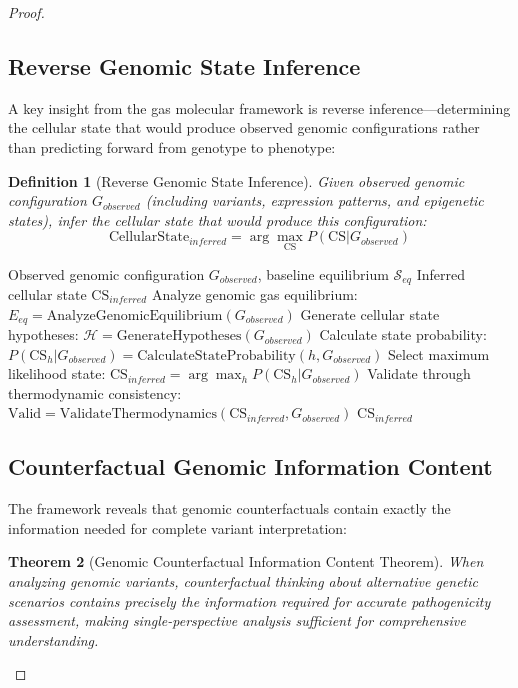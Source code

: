 \documentclass[12pt,a4paper]{article}
\newtheorem{theorem}{Theorem}[section]
\newtheorem{definition}[theorem]{Definition}
\begin{document}
\begin{proof}
\subsection{Reverse Genomic State Inference}

A key insight from the gas molecular framework is reverse inference—determining the cellular state that would produce observed genomic configurations rather than predicting forward from genotype to phenotype:

\begin{definition}[Reverse Genomic State Inference]
Given observed genomic configuration $G_{observed}$ (including variants, expression patterns, and epigenetic states), infer the cellular state that would produce this configuration:
$$\text{CellularState}_{inferred} = \arg\max_{\text{CS}} P(\text{CS} | G_{observed})$$
\end{definition}

\begin{algorithm}
\caption{Reverse Genomic State Inference Algorithm}
\begin{algorithmic}[1]
\Require Observed genomic configuration $G_{observed}$, baseline equilibrium $\mathcal{S}_{eq}$
\Ensure Inferred cellular state $\text{CS}_{inferred}$
\State Analyze genomic gas equilibrium: $E_{eq} = \text{AnalyzeGenomicEquilibrium}(G_{observed})$
\State Generate cellular state hypotheses: $\mathcal{H} = \text{GenerateHypotheses}(G_{observed})$
    \State Calculate state probability: $P(\text{CS}_h | G_{observed}) = \text{CalculateStateProbability}(h, G_{observed})$
\EndFor
\State Select maximum likelihood state: $\text{CS}_{inferred} = \arg\max_h P(\text{CS}_h | G_{observed})$
\State Validate through thermodynamic consistency: $\text{Valid} = \text{ValidateThermodynamics}(\text{CS}_{inferred}, G_{observed})$
\Return $\text{CS}_{inferred}$
\end{algorithmic}
\end{algorithm}

\subsection{Counterfactual Genomic Information Content}

The framework reveals that genomic counterfactuals contain exactly the information needed for complete variant interpretation:

\begin{theorem}[Genomic Counterfactual Information Content Theorem]
When analyzing genomic variants, counterfactual thinking about alternative genetic scenarios contains precisely the information required for accurate pathogenicity assessment, making single-perspective analysis sufficient for comprehensive understanding.
\end{theorem}


\end{proof}
\end{document}
